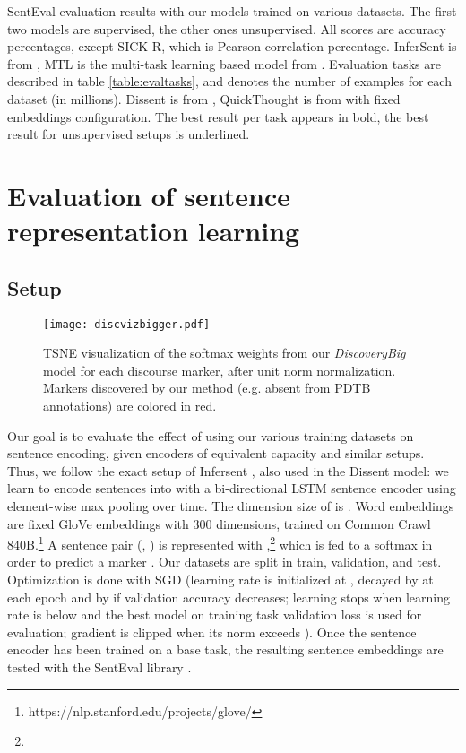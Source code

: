 \documentclass[11pt,a4paper]{article}
\begin{document}
\begin{table*}[htb]
\begin{small}
 \caption{SentEval evaluation results with our models trained on various datasets.
 The first two models are supervised, the other ones unsupervised. All scores are accuracy percentages, except SICK-R, which is Pearson correlation percentage.
InferSent is from  \citet{Conneau2017},
 MTL is the multi-task learning based model from \citet{subramanian2018learning}.
 Evaluation tasks are described in table \ref{table:evaltasks}, and  denotes the number of examples for each dataset (in millions).
 Dissent is from \citet{Nie2017}, QuickThought is from \citet{Logeswaran2018} with fixed embeddings configuration. 
 The best result per task appears in bold, the best result for unsupervised setups is underlined.
 \label{table:ressenteval}
 }
\end{small}
\end{table*}





\section{Evaluation of sentence representation learning}
\subsection{Setup}
\begin{figure*}[htb]
  \centering
\texttt{[image: discvizbigger.pdf]}
\caption{TSNE visualization of the softmax weights from our \textit{DiscoveryBig} model for each discourse marker, after unit norm normalization. Markers discovered by our method (e.g. absent from PDTB annotations) are colored in red.}
\label{fig:tsne} 
\end{figure*}


Our goal is to evaluate the effect of using our various training datasets on sentence encoding, given encoders of equivalent capacity and similar setups.
Thus, we follow the exact setup of Infersent \citep{Conneau2017}, also used in the Dissent \citep{Malmi2018} model: we learn to encode sentences into  with a bi-directional LSTM  sentence encoder using element-wise max pooling over time. 
The dimension size of  is .  Word embeddings are fixed GloVe embeddings with 300 dimensions, trained on Common Crawl 840B.\footnote{https://nlp.stanford.edu/projects/glove/} 
A sentence pair (, ) is represented with ,\footnote{} which is fed to a softmax in order to predict a marker .
Our datasets are split in  train,  validation, and  test. 
Optimization is done with SGD (learning rate is initialized at , decayed by  at each epoch and by  if validation accuracy decreases; learning stops when learning rate is below  and the best model on training task validation loss is used for evaluation; gradient is clipped when its norm exceeds ). Once the sentence encoder has been trained on a base task, the resulting sentence embeddings are tested with the SentEval library \citep{Conneau2017}.
\end{document}
